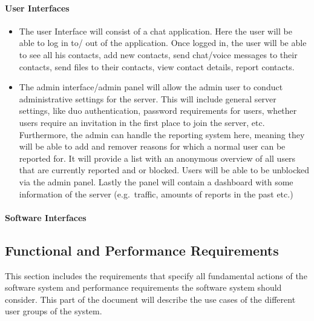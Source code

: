 \paragraph{User Interfaces}
\begin{itemize}
    \item The user Interface will consist of a chat application.
    Here the user will be able to log in to/ out of the application.
    Once logged in, the user will be able to see all his contacts, add new contacts, send chat/voice messages to their
    contacts, send files to their contacts, view contact details, report contacts.
    \item The admin interface/admin panel will allow the admin user to conduct administrative settings for the server.
    This will include general server settings, like duo authentication, password requirements for users, whether users
    require an invitation in the first place to join the server, etc.
    Furthermore, the admin can handle the reporting system here, meaning they will be able to add and remover reasons
    for which a normal user can be reported for.
    It will provide a list with an anonymous overview of all users that are currently reported and or blocked.
    Users will be able to be unblocked via the admin panel.
    Lastly the panel will contain a dashboard with some information of the server (e.g.\ traffic, amounts of reports in
    the past etc.)
\end{itemize}

\paragraph{Software Interfaces}

\subsection{Functional and Performance Requirements}\label{subsec:functional-and-performance-requirements}

This section includes the requirements that specify all fundamental actions of the software system and performance
requirements the software system should consider.
This part of the document will describe the use cases of the different user groups of the system.

